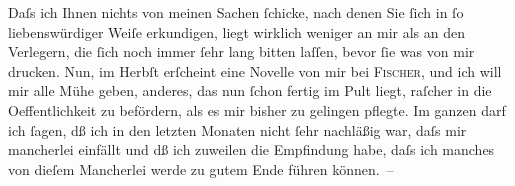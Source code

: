 \pstart
           Daſs ich Ihnen nichts von meinen Sachen{ }ſchicke, nach denen Sie{ }ſich in{ }ſo
               liebenswürdiger Weiſe erkundigen, liegt wirklich weniger an mir als an den Verlegern,
               die{ }ſich noch {\pb}immer{ }ſehr lang bitten laſſen, bevor{ }ſie was
               von mir drucken. Nun, im Herbſt erſcheint eine Novelle von mir bei \textsc{Fischer}, und ich will mir alle Mühe geben, anderes, das nun{ }ſchon fertig im Pult liegt,
               raſcher in die Oeffentlichkeit zu befördern, als es mir bisher zu gelingen pflegte.
               Im ganzen darf ich{ }ſagen, dß ich in den letzten Monaten nicht {\pb}ſehr nachläßig war, daſs mir mancherlei einfällt und dß ich
               zuweilen die Empfindung habe, daſs ich manches von dieſem Mancherlei werde zu gutem
               Ende führen können. –\pend
           

